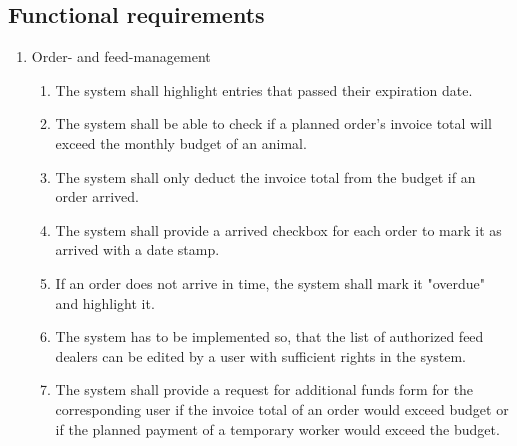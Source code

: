 \subsection{Functional requirements}
\begin{enumerate}[label*=\arabic*]
\item Order- and feed-management
	\begin{enumerate}[label*=\arabic*]
        \item The system shall highlight entries that passed their expiration date.
        \item The system shall be able to check if a planned order’s invoice total will exceed the monthly budget of an animal.
        \item The system shall only deduct the invoice total from the budget if an order arrived.
        \item The system shall provide a arrived checkbox for each order to mark it as arrived with a date stamp.
        \item If an order does not arrive in time, the system shall mark it "overdue" and highlight it.
        \item The system has to be implemented so, that the list of authorized feed dealers can be edited by a user with sufficient rights in the system.
        \item The system shall provide a request for additional funds form for the corresponding user if the invoice total of an order would exceed budget or if the planned payment of a temporary worker would exceed the budget.
	\end{enumerate}


\end{enumerate}
